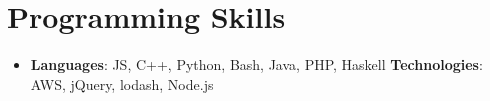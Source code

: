 \documentclass[letterpaper,11pt]{article}
\newcommand{\resumeSubHeadingListStart}{\begin{itemize}[leftmargin=*]}
\newcommand{\resumeSubHeadingListEnd}{\end{itemize}}
\begin{document}
\section{Programming Skills}
  \resumeSubHeadingListStart
    \item{
      \textbf{Languages}{: JS, C++, Python, Bash, Java, PHP, Haskell}
      \hfill
      \textbf{Technologies}{: AWS, jQuery, lodash, Node.js}
    }
  \resumeSubHeadingListEnd


\end{document}
